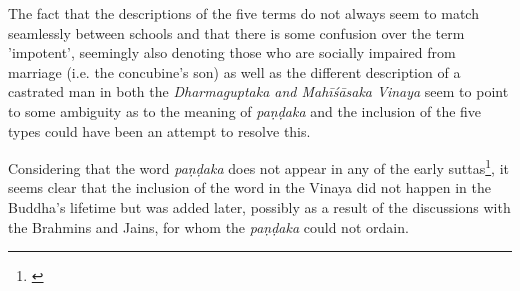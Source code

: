 The fact that the descriptions of the five terms do not always seem to match seamlessly between schools and that there is some confusion over the term 'impotent', seemingly also denoting those who are socially impaired from marriage (i.e. the concubine's son) as well as the different description of a castrated man in both the {\em Dharmaguptaka and Mahīśāsaka Vinaya} seem to point to some ambiguity as to the meaning of {\em paṇḍaka} and the inclusion of the five types could have been an attempt to resolve this.

Considering that the word {\em paṇḍaka} does not appear in any of the early suttas\footnote{\cite{vimala}}, it seems clear that the inclusion of the word in the Vinaya did not happen in the Buddha's lifetime but was added later, possibly as a result of the discussions with the Brahmins and Jains, for whom the {\em paṇḍaka} could not ordain.
